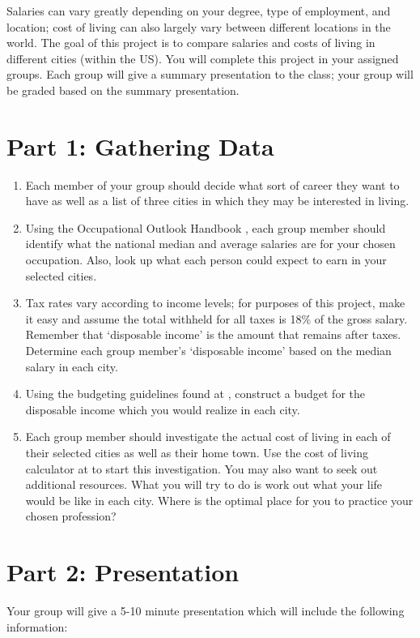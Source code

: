 \documentclass{article}
\begin{document}
Salaries can vary greatly depending on your degree, type of
employment, and location; cost of living can also largely vary between
different locations in the world. The goal of this project is to
compare salaries and costs of living in different cities (within the
US). You will complete this project in your assigned groups. Each
group will give a summary presentation to the class; your group will be
graded based on the summary presentation.

\section*{Part 1: Gathering Data}
\begin{enumerate}
	\item Each member of your group should decide what sort of career they want to have as well as a list of three cities in which they may be interested in living.
	\item Using the Occupational Outlook Handbook , each group member should identify what the national median and average salaries are for your chosen occupation.  Also, look up what each person could expect to earn in your selected cities.
	\item Tax rates vary according to income levels; for purposes of this project, make it easy and assume the total withheld for all taxes is 18\% of the gross salary. Remember that ‘disposable income’ is the amount that remains after taxes. Determine each group member’s ‘disposable income’ based on the median salary in each city.
	\item Using the budgeting guidelines found at , construct a budget for the disposable income which you would realize in each city.
	\item Each group member should investigate the actual cost of
    living in each of their selected cities as well as their home
    town.  Use the cost of living calculator at  to start this investigation.  You may also want to seek out additional resources.  What you will try to do is work out what your life would be like in each city.  Where is the optimal place for you to practice your chosen profession?
\end{enumerate}

\section*{Part 2: Presentation}
Your group will give a 5-10 minute presentation which will include the
following information: 
\end{document}
